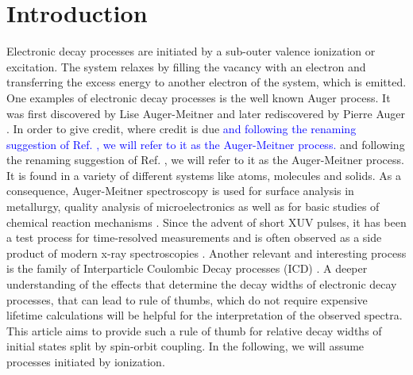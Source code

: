 \section{Introduction}
Electronic decay processes are initiated by a sub-outer valence ionization
or excitation. The system relaxes by filling the vacancy with an electron and
transferring the excess energy to another electron of the system, which is emitted.
One examples of electronic decay processes is the
well known Auger process. It was first discovered
by Lise Auger-Meitner \cite{Meitner22} and later rediscovered
by Pierre Auger \cite{Auger23}. In order to give credit, where credit is due
\textcolor{blue}
{and following the renaming suggestion of Ref. \cite{renamingAuger19},
we will refer to it as the Auger-Meitner process.}
and following the renaming suggestion of Ref. \cite{renamingAuger19},
we will refer to it as the Auger-Meitner process.
It is found in a variety of different systems like atoms, molecules and solids.
As a consequence, Auger-Meitner spectroscopy
is used for surface analysis in metallurgy,
quality analysis of microelectronics
as well as for basic studies of chemical reaction mechanisms \cite{AES_Seah_86}.
Since the advent of short XUV pulses, it has been a test process for
time-resolved measurements \cite{Smirnova03}
and is often observed as a side product of modern x-ray spectroscopies
\cite{Greczynski20}.
Another relevant and interesting process is the family of Interparticle
Coulombic Decay processes (ICD) \cite{Cederbaum97,Hergenhahn11,Jahnke15}.
A deeper understanding of the effects that determine the decay widths
of electronic decay processes, that
can lead to rule of thumbs, which do not require expensive lifetime
calculations will
be helpful for the interpretation of the observed spectra.
This article aims to provide such a rule of thumb for relative decay widths
of initial states split by spin-orbit coupling.
In the following, we will assume processes initiated by ionization.

